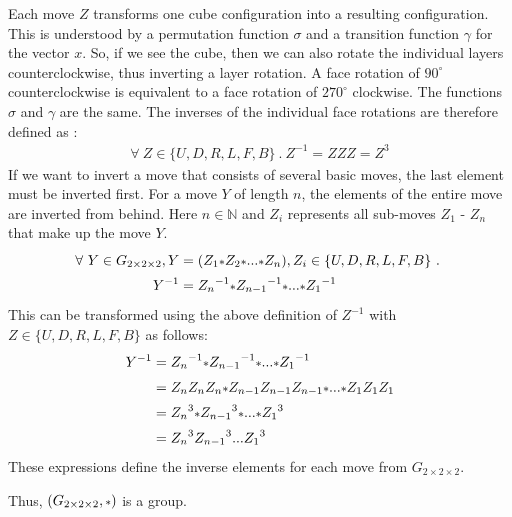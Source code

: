 \documentclass[12pt,a4paper]{article}
\theoremstyle{custom}
\newcommand{\Gtwo}{\ensuremath{G_{2\times 2\times 2}}}
\begin{document}
\begin{description}
Each move $Z$ transforms one cube configuration into a resulting configuration.
This is understood by a permutation function $\sigma$ and a transition function $\gamma$ for the vector $x$.
So, if we see the cube, then we can also rotate the individual layers counterclockwise, thus inverting a layer rotation. A face rotation of $90^\circ$ counterclockwise is equivalent to a face rotation of $270^\circ$ clockwise. The functions $\sigma$ and $\gamma$ are the same.
The inverses of the individual face rotations are therefore defined as :
\begin{align*}
\forall \ Z \in \{U, D, R, L, F, B\} \ . \ Z^{-1} = ZZZ = Z^3
\end{align*}
If we want to invert a move that consists of several basic moves, the last element must be inverted first. For a move $Y$ of length $n$, the elements of the entire move are inverted from behind. Here $n \in \mathbb {N}$ and $Z_i$ represents all sub-moves $Z_1$ - $Z_n$ that make up the move $Y$.
\begin{align*}
\forall \ Y \in \Gtwo, Y & = (Z_1 \mathlarger{\scriptstyle*} Z_2 \mathlarger{\scriptstyle*} ... \mathlarger{\scriptstyle*} Z_n), Z_{i} \in \{U, D, R, L, F, B\} \ . \ \\
Y^{-1} & = {Z_n}^{-1} \mathlarger{\scriptstyle*} {Z_{n-1}}^{-1} \mathlarger{\scriptstyle*} ... \mathlarger{\scriptstyle*} {Z_1}^{-1}
\end{align*}
This can be transformed using the above definition of $Z^{-1}$ with $Z \in \{U, D, R, L, F, B\} $ as follows:
\begin{align*}
Y^{-1} & = {Z_n}^{-1} \mathlarger{\scriptstyle*} {Z_{n-1}}^{-1} \mathlarger{\scriptstyle*} ... \mathlarger{\scriptstyle*} {Z_1}^{-1} \\
& = Z_nZ_nZ_n \mathlarger{\scriptstyle*} Z_{n-1}Z_{n-1}Z_{n-1} \mathlarger{\scriptstyle*} ... \mathlarger{\scriptstyle*} Z_1Z_1Z_1 \\
& = {Z_n}^3 \mathlarger{\scriptstyle*} {Z_{n-1}}^3 \mathlarger{\scriptstyle*} ... \mathlarger{\scriptstyle*} {Z_1}^3 \\
& = {Z_n}^3{Z_{n-1}}^3 ... {Z_1}^3 \\
\end{align*}
These expressions define the inverse elements for each move from $\Gtwo$.

\end{description}
Thus, $(\Gtwo, \mathlarger{\scriptstyle*})$ is a group. 
\end{document}
